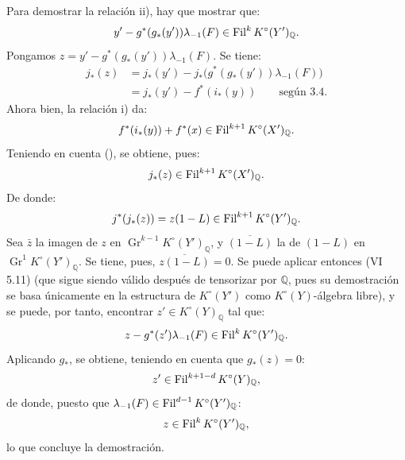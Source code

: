 Para demostrar la relación ii), hay que mostrar que:
\[
  y'-g^*(g_*(y'))\lambda_{-1}(F)\in\operatorname{Fil}^kK^\circ(Y')_{\mathbb Q}.
\]
Pongamos \(z=y'-g^*(g_*(y'))\lambda_{-1}(F)\). Se tiene:
\[
\begin{aligned}
j_*(z)
  &=j_*(y')-j_*\bigl(g^*(g_*(y'))\lambda_{-1}(F)\bigr)\\
  &=j_*(y')-f^*(i_*(y))\qquad\text{según 3.4.}
\end{aligned}
\]
Ahora bien, la relación i) da:
\[
  f^*(i_*(y))+f^*(x)\in\operatorname{Fil}^{k+1}K^\circ(X')_{\mathbb Q}.
\]
Teniendo en cuenta (), se obtiene, pues:
\[
  j_*(z)\in\operatorname{Fil}^{k+1}K^\circ(X')_{\mathbb Q}.
\]
De donde:
\[
  j^*(j_*(z))=z(1-L)\in\operatorname{Fil}^{k+1}K^\circ(Y')_{\mathbb Q}.
\]
Sea \(\bar z\) la imagen de \(z\) en \(\operatorname{Gr}^{k-1}K^\circ(Y')_{\mathbb Q}\), y \(\overline{(1-L)}\) la de \((1-L)\) en \(\operatorname{Gr}^{1}K^\circ(Y')_{\mathbb Q}\). Se tiene, pues, \(\overline{z(1-L)}=0\). Se puede aplicar entonces (VI 5.11) (que sigue siendo válido después de tensorizar por \(\mathbb Q\), pues su demostración se basa únicamente en la estructura de \(K^\circ(Y')\) como \(K^\circ(Y)\)-álgebra libre), y se puede, por tanto, encontrar \(z'\in K^\circ(Y)_{\mathbb Q}\) tal que:
\[
  z-g^*(z')\lambda_{-1}(F)\in\operatorname{Fil}^kK^\circ(Y')_{\mathbb Q}.
\]
Aplicando \(g_*\), se obtiene, teniendo en cuenta que \(g_*(z)=0\):
\[
  z'\in\operatorname{Fil}^{k+1-d}K^\circ(Y)_{\mathbb Q},
\]
de donde, puesto que \(\lambda_{-1}(F)\in\operatorname{Fil}^{d-1}K^\circ(Y')_{\mathbb Q}\):
\[
  z\in\operatorname{Fil}^kK^\circ(Y')_{\mathbb Q},
\]
lo que concluye la demostración.
